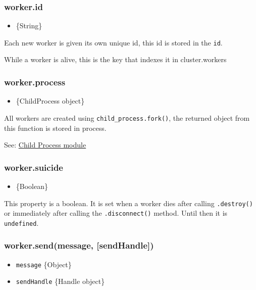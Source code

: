 \subsubsection{worker.id}

\begin{itemize}
\item
  \{String\}
\end{itemize}

Each new worker is given its own unique id, this id is stored in the
\texttt{id}.

While a worker is alive, this is the key that indexes it in
cluster.workers

\subsubsection{worker.process}

\begin{itemize}
\item
  \{ChildProcess object\}
\end{itemize}

All workers are created using \texttt{child\_process.fork()}, the
returned object from this function is stored in process.

See: \href{child\_process.html}{Child Process module}

\subsubsection{worker.suicide}

\begin{itemize}
\item
  \{Boolean\}
\end{itemize}

This property is a boolean. It is set when a worker dies after calling
\texttt{.destroy()} or immediately after calling the
\texttt{.disconnect()} method. Until then it is \texttt{undefined}.

\subsubsection{worker.send(message, {[}sendHandle{]})}

\begin{itemize}
\item
  \texttt{message} \{Object\}
\item
  \texttt{sendHandle} \{Handle object\}
\end{itemize}

